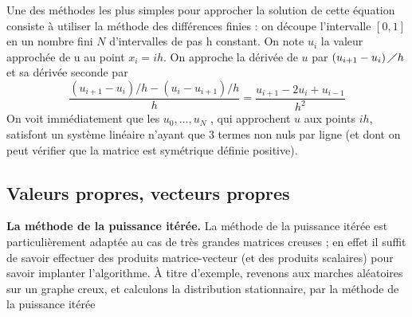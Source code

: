 Une des méthodes les plus simples pour approcher la solution de cette équation consiste à utiliser la méthode des différences finies : on découpe l'intervalle $\left[0, 1\right]$ en un nombre fini $N$ d'intervalles de pas h constant. On note $u_{i}$ la valeur approchée de u au point $x_{i} = ih$. On approche la dérivée de $u$ par $\left(u_{i+1} - u_{i}\right) \diagup h$ et sa dérivée seconde par
\[
\frac{\left(u_{i+1}-u_{i}\right)/h - \left(u_{i}-u_{i+1}\right)/h} {h} = \frac{u_{i+1}-2u_{i}+u_{i-1}}{h^{2}}
\]
On voit immédiatement que les $u_{0},..., u_{N}$ , qui approchent $u$ aux points $ih$, satisfont un système linéaire n'ayant que $3$ termes non nuls par ligne (et dont on peut vérifier que la matrice est symétrique définie positive).
\subsection{Valeurs propres, vecteurs propres}
\begin{flushright}
\textbf{La méthode de la puissance itérée.} La méthode de la puissance itérée est particulièrement adaptée au cas de très grandes matrices creuses ; en effet il suffit de savoir effectuer des produits matrice-vecteur (et des produits scalaires) pour savoir implanter l'algorithme. À titre d'exemple, revenons aux marches aléatoires sur un graphe creux, et calculons la distribution stationnaire, par la méthode de la puissance itérée
\end{flushright}
